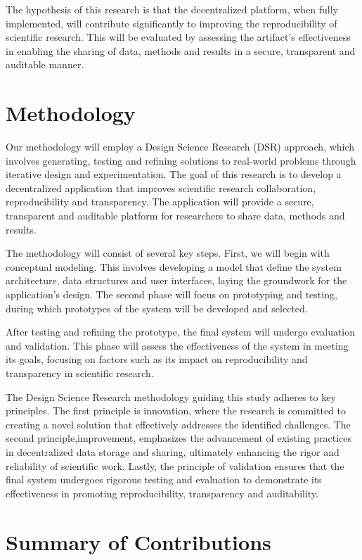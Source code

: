 \documentclass{article}
\begin{document}
The hypothesis of this research is that the decentralized platform, when fully implemented, will contribute significantly to improving the reproducibility of scientific research. This will be evaluated by assessing the artifact’s effectiveness in enabling the sharing of data, methods and results in a secure, transparent and auditable manner.

\section{Methodology}

Our methodology will employ a Design Science Research (DSR) approach, which involves generating, testing and refining solutions to real-world problems through iterative design and experimentation. The goal of this research is to develop a decentralized application that improves scientific research collaboration, reproducibility and transparency. The application will provide a secure, transparent and auditable platform for researchers to share data, methods and results.

The methodology will consist of several key steps. First, we will begin with conceptual modeling. This involves developing a model that define the system architecture, data structures and user interfaces, laying the groundwork for the application’s design. The second phase will focus on prototyping and testing, during which prototypes of the system will be developed and selected.

After testing and refining the prototype, the final system will undergo evaluation and validation. This phase will assess the effectiveness of the system in meeting its goals, focusing on factors such as its impact on reproducibility and transparency in scientific research.

The Design Science Research methodology guiding this study adheres to key principles. The first principle is innovation, where the research is committed to creating a novel solution that effectively addresses the identified challenges. The second principle,improvement, emphasizes the advancement of existing practices in decentralized data storage and sharing, ultimately enhancing the rigor and reliability of scientific work. Lastly, the principle of validation ensures that the final system undergoes rigorous testing and evaluation to demonstrate its effectiveness in promoting reproducibility, transparency and auditability.

\section{Summary of Contributions}
\end{document}
